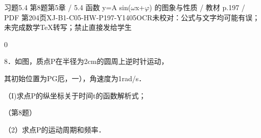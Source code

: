 \begin{bankitem}{习题5.4 第8题}{第5章 / 5.4 函数 y=A sin(\ensuremath{\omega}x+\ensuremath{\varphi}) 的图象与性质 / 教材 p.197 / PDF 第204页}{XJ-B1-C05-HW-P197-Y1405}{OCR未校对：公式与文字均可能有误；未完成数学TeX转写；禁止直接发给学生}
\begin{ocrdraft}
\par
0
\par
8．如图，质点P在半径为2cm的圆周上逆时针运动，
\par
其初始位置为PG厄，一），角速度为1rad/s．
\par
（I)求点P的纵坐标关于时间t的函数解析式；
\par
（第8题）
\par
（2）求点P的运动周期和频率．
\end{ocrdraft}
\end{bankitem}
